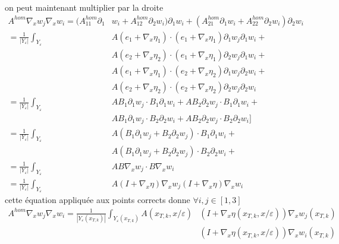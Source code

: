 \documentclass[11pt]{article}
\newcommand{\Ah}{A^{hom}}
\newcommand{\Ye}{Y_\varepsilon}
\begin{document}
on peut maintenant multiplier par la droite
\begin{equation}
  \begin{aligned}
    \Ah\nabla_x w_j \nabla_x w_i =(\Ah_{11} \partial_1& w_i + \Ah_{12} \partial_2 w_i) \partial_1 w_i
    + (\Ah_{21} \partial_1 w_i + \Ah_{22} \partial_2 w_i ) \partial_2 w_i \\
    = \frac{1}{|\Ye|} \int_{\Ye} &A(e_1 + \nabla_x \eta_1)\cdot(e_1 + \nabla_x \eta_1) \partial_1 w_j \partial_1 w_i + \\
    &A(e_2 + \nabla_x \eta_2)\cdot(e_1 + \nabla_x \eta_1) \partial_2 w_j \partial_1 w_i +\\ 
    &A(e_1 + \nabla_x \eta_1)\cdot(e_2 + \nabla_x \eta_2) \partial_1 w_j \partial_2 w_i +\\
    &A(e_2 + \nabla_x \eta_2)\cdot(e_2 + \nabla_x \eta_2) \partial_2 w_j \partial_2 w_i  \\
    = \frac{1}{|\Ye|} \int_{\Ye} &A B_1 \partial_1 w_j \cdot B_1 \partial_1 w_i + A B_2 \partial_2 w_j \cdot B_1 \partial_1 w_i +\\ 
    &A B_1 \partial_1 w_j \cdot B_2 \partial_2 w_i + A B_2 \partial_2 w_j \cdot B_2 \partial_2 w_i \big] \\
    = \frac{1}{|\Ye|} \int_{\Ye} &A (B_1 \partial_1 w_j + B_2 \partial_2 w_j ) \cdot B_1 \partial_1 w_i + \\
    &A (B_1 \partial_1 w_j  + B_2 \partial_2 w_j )\cdot B_2 \partial_2 w_i +\\
    = \frac{1}{|\Ye|} \int_{\Ye} &A  B\nabla_x w_j \cdot B\nabla_x w_i  \\
    = \frac{1}{|\Ye|} \int_{\Ye} &A(I + \nabla_x \eta) \nabla_x w_j (I + \nabla_x \eta) \nabla_x w_i
  \end{aligned}
\end{equation}
cette équation appliquée aux points corrects donne $\forall i,j\in [1,3]$
\begin{equation*}
  \begin{aligned}
    \Ah\nabla_x w_j \nabla_x w_i = \frac{1}{|\Ye(x_{T, k})|} \int_{\Ye(x_{T, k})} A(x_{T, k}, x/\varepsilon)&(I + \nabla_x \eta(x_{T, k},
    x/\varepsilon)) \nabla_x w_j(x_{T, k}) \\
    &(I + \nabla_x \eta(x_{T, k}, x/\varepsilon)) \nabla_x w_i(x_{T, k})
  \end{aligned}
\end{equation*}
\end{document}
